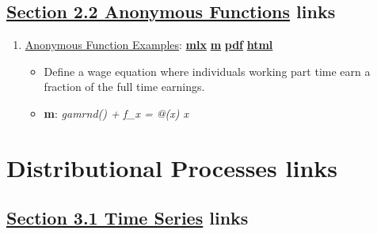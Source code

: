 \documentclass[
]{book}
\providecommand{\tightlist}{%
  \setlength{\itemsep}{0pt}\setlength{\parskip}{0pt}}
\begin{document}
\hypertarget{section-2.2-anonymous-functionsanonymous-functions-links}{%
\subsection{\texorpdfstring{\protect\hyperlink{anonymous-functions}{Section 2.2 Anonymous Functions} links}{Section 2.2 Anonymous Functions links}}\label{section-2.2-anonymous-functionsanonymous-functions-links}}

\begin{enumerate}
\def\labelenumi{\arabic{enumi}.}
\tightlist
\item
  \href{https://fanwangecon.github.io/M4Econ/function/anonymous/htmlpdfm/fs_anonymous_func.html}{Anonymous Function Examples}: \href{https://github.com/FanWangEcon/M4Econ/blob/master/function/anonymous/fs_anonymous_func.mlx}{\textbf{mlx}} \textbar{} \href{https://github.com/FanWangEcon/M4Econ/blob/master/function/anonymous/htmlpdfm/fs_anonymous_func.m}{\textbf{m}} \textbar{} \href{https://github.com/FanWangEcon/M4Econ/blob/master/function/anonymous/htmlpdfm/fs_anonymous_func.pdf}{\textbf{pdf}} \textbar{} \href{https://fanwangecon.github.io/M4Econ/function/anonymous/htmlpdfm/fs_anonymous_func.html}{\textbf{html}}

  \begin{itemize}
  \tightlist
  \item
    Define a wage equation where individuals working part time earn a fraction of the full time earnings.
  \item
    \textbf{m}: \emph{gamrnd() + f\_x = @(x) x}
  \end{itemize}
\end{enumerate}

\hypertarget{distributional-processes-links}{%
\section{Distributional Processes links}\label{distributional-processes-links}}

\hypertarget{section-3.1-time-seriestime-series-links}{%
\subsection{\texorpdfstring{\protect\hyperlink{time-series}{Section 3.1 Time Series} links}{Section 3.1 Time Series links}}\label{section-3.1-time-seriestime-series-links}}
\end{document}
